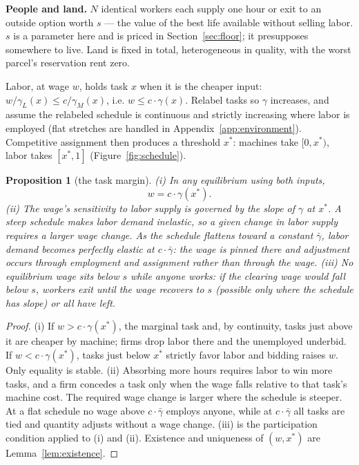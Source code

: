 \documentclass[12pt]{article}
\theoremstyle{plain}
\newtheorem{proposition}{Proposition}
\begin{document}
\textbf{People and land.} $N$ identical workers each supply one hour or exit to an
outside option worth $s$ --- the value of the best life available without selling
labor. $s$ is a parameter here and is priced in Section~\ref{sec:floor}; it
presupposes somewhere to live. Land is fixed in total, heterogeneous in quality,
with the worst parcel's reservation rent zero.

Labor, at wage $w$, holds task $x$ when it is the cheaper input:
$w/\gamma_L(x) \le c/\gamma_M(x)$, i.e.
$w \le c\cdot\gamma(x)$. Relabel tasks so $\gamma$ increases, and assume the
relabeled schedule is continuous and strictly increasing where labor is employed
(flat stretches are handled in Appendix~\ref{app:environment}). Competitive
assignment then produces a threshold $x^*$: machines take $[0,x^*)$, labor takes
$[x^*,1]$ (Figure~\ref{fig:schedule}).

\begin{proposition}[the task margin]\label{prop:margin}
(i) In any equilibrium using both inputs,
\[
w = c\cdot\gamma(x^*).
\]
(ii) The wage's sensitivity to labor supply is governed by the slope of $\gamma$
at $x^*$. A steep schedule makes labor demand inelastic, so a given change in
labor supply requires a larger wage change. As the schedule flattens toward a
constant $\bar{\gamma}$, labor demand becomes perfectly elastic at
$c\cdot\bar{\gamma}$: the wage is pinned there and adjustment occurs through
employment and assignment rather than through the wage.
(iii) No equilibrium wage sits below $s$ while anyone works: if the clearing wage
would fall below $s$, workers exit until the wage recovers to $s$ (possible only
where the schedule has slope) or all have left.
\end{proposition}

\begin{proof}
(i) If $w > c\cdot\gamma(x^*)$, the marginal task and, by continuity, tasks just
above it are cheaper by machine; firms drop labor there and the unemployed
underbid. If $w < c\cdot\gamma(x^*)$, tasks just below $x^*$ strictly favor labor
and bidding raises $w$. Only equality is stable.
(ii) Absorbing more hours requires labor to win more tasks, and a firm concedes a
task only when the wage falls relative to that task's machine cost. The required
wage change is larger where the schedule is steeper. At a flat schedule no wage
above $c\cdot\bar{\gamma}$ employs anyone, while at
$c\cdot\bar{\gamma}$ all tasks are tied and quantity adjusts without a wage
change.
(iii) is the participation condition applied to (i) and (ii). Existence and
uniqueness of $(w,x^*)$ are Lemma~\ref{lem:existence}.
\end{proof}
\end{document}
